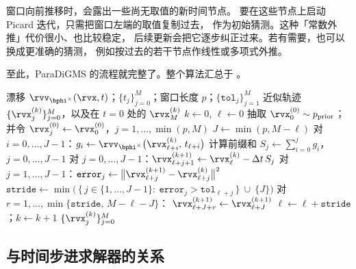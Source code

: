 窗口向前推移时，会露出一些尚无取值的新时间节点。
要在这些节点上启动 Picard 迭代，只需把窗口左端的取值复制过去，
作为初始猜测。这种「常数外推」代价很小、也比较稳定，
后续更新会把它逐步纠正过来。若有需要，也可以换成更准确的猜测，
例如按过去的若干节点作线性或多项式外推。

至此，ParaDiGMS 的流程就完整了。整个算法汇总于 。

\begin{algorithm}[t]
  \caption{带滑动窗口的 ParaDiGMS}
  \label{alg:paradigms}
  \begin{algorithmic}[1]
    \Require 漂移 $\rvv_{\bphi^\times}(\rvx,t)$；$\{t_j\}_{j=0}^{M}$；窗口长度 $p$；$\{\mathtt{tol}_j\}_{j=1}^{M}$
    \Ensure 近似轨迹 $\{\rvx^{(k)}_j\}_{j=0}^{M}$，以及在 $t=0$ 处的 $\rvx^{(k)}_M$
    \State $k \gets 0$, $\ell \gets 0$
    \State 抽取 $\rvx^{(0)}_0 \sim p_{\mathrm{prior}}$；并令 $\rvx^{(0)}_j \gets \rvx^{(0)}_0$，$j=1,\ldots,\min(p,M)$
    \Statex {}
      \State $J \gets \min(p,  M-\ell)$   
      \State {}
      \State 对 $i=0,\ldots,J-1$：$g_i \gets \rvv_{\bphi^\times} \big(\rvx^{(k)}_{\ell+i},\, t_{\ell+i}\big)$
      \Statex {}
      \State 计算前缀和 $S_j \gets \sum_{i=0}^{j} g_i$，$j=0,\ldots,J-1$
      \Statex {}
      \State {}
      \State 对 $j=0,\ldots,J-1$：$\displaystyle \rvx^{(k+1)}_{\ell+j+1} \gets \rvx^{(k)}_{\ell} - \Delta t\, S_j$
      \Statex {}
      \State {}
      \State 对 $j=1,\ldots,J-1$：$\mathtt{error}_j \gets \big\|\rvx^{(k+1)}_{\ell+j}-\rvx^{(k)}_{\ell+j}\big\|^2$
      \Statex {}
      \State $\displaystyle \mathtt{stride} \gets \min \Big(\,\{\,j\in\{1,\ldots,J-1\}:~\mathtt{error}_j>\mathtt{tol}_{\ell+j}\,\}\ \cup\ \{J\}\Big)$
      \State {}
        \State 对 $r=1,\ldots,\min\{\mathtt{stride},\,M-\ell-J\}$：
        $\rvx^{(k+1)}_{\ell+J+r}
        \gets
        \rvx^{(k+1)}_{\ell+J}$
      \Statex {}
      \State $\ell \gets \ell + \mathtt{stride}$；\quad $k \gets k+1$
    \EndWhile
    \State \Return $\{\rvx^{(k)}_j\}_{j=0}^{M}$
  \end{algorithmic}
\end{algorithm}


\subsection{与时间步进求解器的关系}

